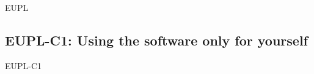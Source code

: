 \begin{license}{EUPL}
\newcommand{\markAllProgramModifications}{
  \auxMarkAllModifications{program}}
\newcommand{\markAllLibraryModifications}{%
  \auxMarkAllModifications{library}}
\newcommand{\markAllEmbeddedModifications}{%
  \auxMarkAllModifications{embedded library}}

\newcommand{\auxApplyCopyleft}[1]{License your program, which includes the
  library, also under the EUPL 1.1.  Arrange the #1 of the on-top development in 
  a way that they are also covered by the EUPL-1.1 licensing statements.}

\newcommand{\applyCopyleftToSources}{\auxApplyCopyleft{sources}}
\newcommand{\applyCopyleftToBinaries}{\auxApplyCopyleft{binaries}}


\newcommand{\auxNewSources}{If you add new source
  code files, insert a header containing your copyright line and an EUPL
  adequate licensing the statement.}

\newcommand{\auxArrangeModifications}{Arrange your modifications in a way that
  they are covered by the existing EUPL licensing statements.}

\newcommand{\arrangeBinaryModifications}{\auxArrangeModifications}
\newcommand{\arrangeSourceModifications}{\auxArrangeModifications\ \auxNewSources}


\newcommand{\addModificationTextFile}{Create a \emph{modification text file}, 
  if such a file still does not exist. \emph{Add} a description of your
  modifications to the \emph{modification text file.}}


\newcommand{\copyrightDialog}{Let the copyright dialog of the on-top development
  clearly say, that it uses the EUPL-1.1 licensed library and that it is itself
  licensed under the EUPL-1.1, too.}

\subsection{EUPL-C1: Using the software only for yourself}
\begin{lsuc}{EUPL-C1}


\end{lsuc}
\end{license}
